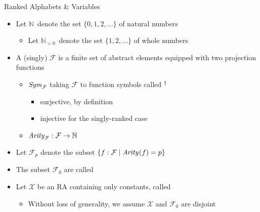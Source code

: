 \documentclass[pdf,fyma2]{prosper} %
\newcommand{\var}[1]{\ensuremath{\text{\textrm{\textit{#1}}}}}
\newcommand{\NAT}{\ensuremath{\mathbb{N}}}
\newcommand{\WHOLE}{\ensuremath{\mathbb{N}_{{>}0}}}
\newcommand{\SYM}[1][]{\ensuremath{\var{Sym}_{#1}}}
\newcommand{\ARITY}[1][]{\ensuremath{\var{Arity}_{#1}}}
\begin{document}
\begin{slide}{Ranked Alphabets \& Variables}
	\vspace{1em}
	\begin{itemize}
	\item Let \NAT\ denote the set $\{0,1,2,\ldots\}$ of natural numbers
	    \begin{itemize}
	    \item Let \WHOLE\ denote the set $\{1,2,\ldots\}$ of whole numbers
	    \end{itemize}
	\vspace{1em}
	\item A (singly)  $\mathcal{F}$ is a finite set of abstract elements equipped with two projection functions
	    \begin{itemize}
	    \item $\SYM[\mathcal{F}]$ taking $\mathcal{F}$ to function symbols called $\null^\dagger$
	        \begin{itemize}
	        \item surjective, by definition
	        \item injective for the singly-ranked case
	        \end{itemize}
	    \item $\ARITY[\mathcal{F}] : \mathcal{F} \to \NAT$
	    \end{itemize}
    \item Let $\mathcal{F}_p$ denote the subset $\{ f : \mathcal{F} \mid \ARITY(f) = p \}$
    \item The subset $\mathcal{F}_0$ are called 
	\vspace{1.5em}
	\item Let $\mathcal{X}$ be an RA containing only constants, called 
        \begin{itemize}
        \item Without loss of generality, we assume $\mathcal{X}$ and $\mathcal{F}_0$ are disjoint
        \end{itemize}
	\end{itemize}
\end{slide}
\end{document}
